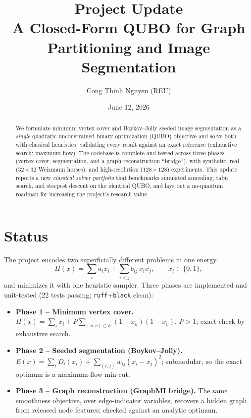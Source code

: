 \documentclass[11pt]{article}
\title{\textbf{Project Update}\\[2pt]
A Closed-Form QUBO for Graph Partitioning and Image Segmentation}
\author{Cong Thinh Nguyen \quad (REU)}
\date{June 12, 2026}
\newcommand{\code}[1]{\texttt{\small #1}}
\begin{document}
\maketitle

\begin{abstract}
\noindent We formulate minimum vertex cover and Boykov--Jolly seeded image
segmentation as a \emph{single} quadratic unconstrained binary optimization
(QUBO) objective and solve both with classical heuristics, validating every
result against an exact reference (exhaustive search; maximum flow). The
codebase is complete and tested across three phases (vertex cover,
segmentation, and a graph-reconstruction ``bridge''), with synthetic, real
($32{\times}32$ Weizmann horses), and high-resolution ($128{\times}128$)
experiments. This update reports a new \emph{classical solver portfolio} that
benchmarks simulated annealing, tabu search, and steepest descent on the
identical QUBO, and lays out a no-quantum roadmap for increasing the project's
research value.
\end{abstract}

\section{Status}
The project encodes two superficially different problems in one energy
\begin{equation}
H(x)=\sum_i a_i x_i+\sum_{i<j} b_{ij}\,x_i x_j,\qquad x_i\in\{0,1\},
\end{equation}
and minimizes it with one heuristic sampler. Three phases are implemented and
unit-tested (22 tests passing; \code{ruff}+\code{black} clean):
\begin{itemize}\itemsep2pt
  \item \textbf{Phase 1 -- Minimum vertex cover.}
        $H(x)=\sum_i x_i+P\sum_{(u,v)\in E}(1-x_u)(1-x_v)$, $P>1$; exact check by
        exhaustive search.
  \item \textbf{Phase 2 -- Seeded segmentation (Boykov--Jolly).}
        $E(x)=\sum_i D_i(x_i)+\sum_{(i,j)}w_{ij}(x_i-x_j)^2$; submodular, so the
        exact optimum is a maximum-flow min-cut.
  \item \textbf{Phase 3 -- Graph reconstruction (GraphMI bridge).} The same
        smoothness objective, over edge-indicator variables, recovers a hidden
        graph from released node features; checked against an analytic optimum.
\end{itemize}
\end{document}
